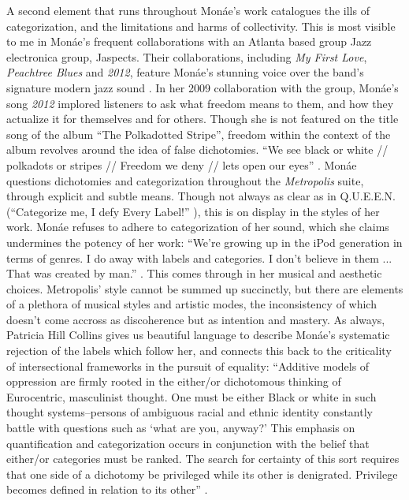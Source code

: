 \documentclass[a4paper, 11pt]{article} %
\begin{document}
A second element that runs throughout Mon\'ae's work catalogues the ills of categorization, and the limitations and harms of collectivity.
This is most visible to me in Mon\'ae's frequent collaborations with an Atlanta based group Jazz electronica group, Jaspects.
Their collaborations, including \emph{My First Love}, \emph{Peachtree Blues} and \emph{2012}, feature Mon\'ae's stunning voice over the band's signature modern jazz sound  .
In her 2009 collaboration with the group, Mon\'ae's song \emph{2012} implored listeners to ask what freedom means to them, and how they actualize it for themselves and for others.
Though she is not featured on the title song of the album ``The Polkadotted Stripe'', freedom within the context of the album revolves around the idea of false dichotomies.
``We see black or white // polkadots or stripes // Freedom we deny // lets open our eyes'' .
Mon\'ae questions dichotomies and categorization throughout the \emph{Metropolis} suite, through explicit and subtle means.
Though not always as clear as in Q.U.E.E.N. (``Categorize me, I defy Every Label!'' ), 
this is on display in the styles of her work.
Mon\'ae refuses to adhere to categorization of her sound, which she claims undermines the potency of her work:
``We're growing up in the iPod generation in terms of genres. I do away with labels and categories. I don't believe in them ... That was created by man.'' .
This comes through in her musical and aesthetic choices.
Metropolis' style cannot be summed up succinctly, but there are elements of a plethora of musical styles and artistic modes, the inconsistency of which doesn't come accross as discoherence but as intention and mastery.
As always, Patricia Hill Collins gives us beautiful language to describe Mon\'ae's systematic rejection of the labels which follow her, and connects this back to the criticality of intersectional frameworks in the pursuit of equality: ``Additive models of oppression are firmly rooted in the either/or dichotomous thinking of Eurocentric, masculinist thought. One must be either Black or white in such thought systems--persons of ambiguous racial and ethnic identity constantly battle with questions such as `what are you, anyway?' This emphasis on quantification and categorization occurs in conjunction with the belief that either/or categories must be ranked. The search for certainty of this sort requires that one side of a dichotomy be privileged while its other is denigrated. Privilege becomes defined in relation to its other'' .
\end{document}
